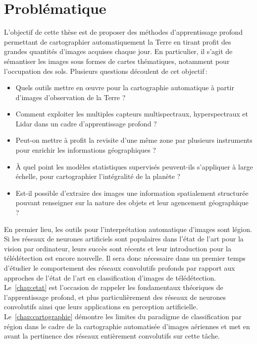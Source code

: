\section{Problématique}

L'objectif de cette thèse est de proposer des méthodes d'apprentissage profond permettant de cartographier automatiquement la Terre en tirant profit des grandes quantités d'images acquises chaque jour. En particulier, il s'agit de sémantiser les images sous formes de cartes thématiques, notamment pour l'occupation des sols. Plusieurs questions découlent de cet objectif\,:
\begin{itemize}
	\item Quels outils mettre en \oe{}uvre pour la cartographie automatique à partir d'images d'observation de la Terre ?
	\item Comment exploiter les multiples capteurs multispectraux, hyperspectraux et Lidar dans un cadre d'apprentissage profond ?
	\item Peut-on mettre à profit la revisite d'une même zone par plusieurs instruments pour enrichir les informations géographiques ?
	\item À quel point les modèles statistiques supervisés peuvent-ils s'appliquer à large échelle, pour cartographier l'intégralité de la planète ?
	\item Est-il possible d'extraire des images une information spatialement structurée pouvant renseigner sur la nature des objets et leur agencement géographique ?
\end{itemize}

En premier lieu, les outils pour l'interprétation automatique d'images sont légion. Si les réseaux de neurones artificiels sont populaires dans l'état de l'art pour la vision par ordinateur, leurs succès sont récents et leur introduction pour la télédétection est encore nouvelle. Il sera donc nécessaire dans un premier temps d'étudier le comportement des réseaux convolutifs profonds par rapport aux approches de l'état de l'art en classification d'images de télédétection. Le~\cref{chap:etat} est l'occasion de rappeler les fondamentaux théoriques de l'apprentissage profond, et plus particulièrement des réseaux de neurones convolutifs ainsi que leurs applications en perception artificielle. Le~\cref{chap:cartographie} démontre les limites du paradigme de classification par région dans le cadre de la cartographie automatisée d'images aériennes et met en avant la pertinence des réseaux entièrement convolutifs sur cette tâche.

